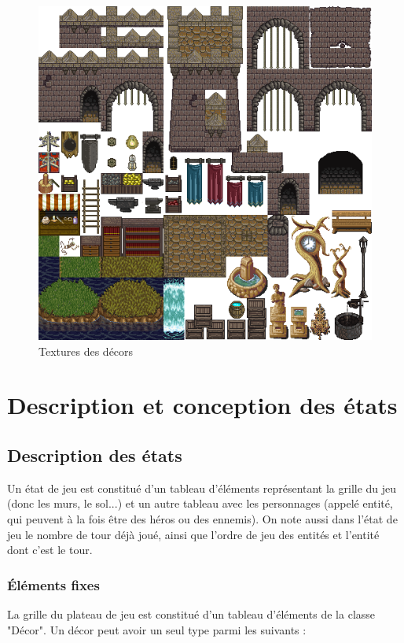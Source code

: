 \documentclass[a4paper,12pt]{article}
\begin{document}
\begin{figure}[hbt!]
    \centering
    \includegraphics[scale=1.5, angle=0]{images/texture_decor1.png}
    \caption{Textures des décors}
    \label{fig:textDecor}
\end{figure}


\clearpage
\section{Description et conception des états}

\subsection{Description des états}
Un état de jeu est constitué d'un tableau d'éléments représentant la grille du jeu (donc les murs, le sol...) et un autre tableau avec les personnages (appelé entité, qui peuvent à la fois être des héros ou des ennemis). On note aussi dans l'état de jeu le nombre de tour déjà joué, ainsi que l'ordre de jeu des entités et l'entité dont c'est le tour.

\subsubsection{Éléments fixes}
La grille du plateau de jeu est constitué d'un tableau d'éléments de la classe "Décor". Un décor peut avoir un seul type parmi les suivants :
\end{document}
